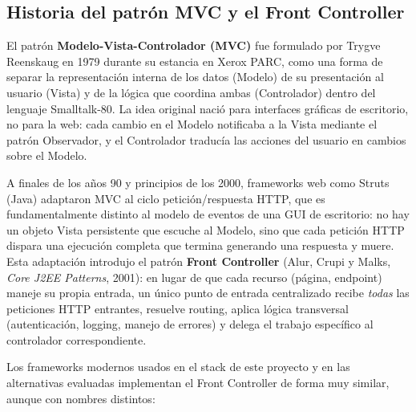 \documentclass[12pt,a4paper]{article}
\begin{document}
	

\subsection{Historia del patrón MVC y el Front Controller}
\label{sec:mvc-front-controller}

El patrón \textbf{Modelo-Vista-Controlador (MVC)} fue formulado por Trygve
Reenskaug en 1979 durante su estancia en Xerox PARC, como una forma de
separar la representación interna de los datos (Modelo) de su presentación
al usuario (Vista) y de la lógica que coordina ambas (Controlador) dentro
del lenguaje Smalltalk-80. La idea original nació para interfaces gráficas
de escritorio, no para la web: cada cambio en el Modelo notificaba a la
Vista mediante el patrón Observador, y el Controlador traducía las
acciones del usuario en cambios sobre el Modelo.

A finales de los años 90 y principios de los 2000, frameworks web como
Struts (Java) adaptaron MVC al ciclo petición/respuesta HTTP, que es
fundamentalmente distinto al modelo de eventos de una GUI de escritorio:
no hay un objeto Vista persistente que escuche al Modelo, sino que cada
petición HTTP dispara una ejecución completa que termina generando una
respuesta y muere. Esta adaptación introdujo el patrón
\textbf{Front Controller} (Alur, Crupi y Malks, \emph{Core J2EE Patterns},
2001): en lugar de que cada recurso (página, endpoint) maneje su propia
entrada, un único punto de entrada centralizado recibe \emph{todas} las
peticiones HTTP entrantes, resuelve routing, aplica lógica transversal
(autenticación, logging, manejo de errores) y delega el trabajo específico
al controlador correspondiente.

Los frameworks modernos usados en el stack de este proyecto y en las
alternativas evaluadas implementan el Front Controller de forma muy
similar, aunque con nombres distintos:
\end{document}
